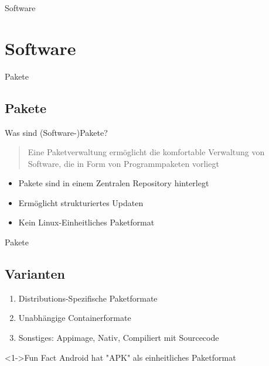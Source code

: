 
\begin{frame}{Software}
    \section{Software}\label{sec:software}
\end{frame}


\begin{frame}{Pakete}
    \subsection{Pakete}\label{subsec:pakete}

    Was sind (Software-)Pakete?
    \pause

    \vspace{0.5cm}
    \begin{quote}
        Eine Paketverwaltung ermöglicht die komfortable Verwaltung von Software, die in Form von Programmpaketen vorliegt
    \end{quote}
    \pause

    \begin{itemize}
        \item Pakete sind in einem Zentralen Repository hinterlegt\pause
        \item Ermöglicht strukturiertes Updaten\pause
        \item Kein Linux-Einheitliches Paketformat
    \end{itemize}
\end{frame}

\begin{frame}{Pakete}
    \subsection{Varianten}\label{subsec:varianten}

    \begin{enumerate}
        \item<1-> Distributions-Spezifische Paketformate
        \item<2-> Unabhängige Containerformate
        \item<3-> Sonstiges: Appimage, Nativ, Compiliert mit Sourcecode
    \end{enumerate}

    \vspace{0.5cm}
    \begin{exampleblock}<1->{Fun Fact}
        Android hat "APK" als einheitliches Paketformat
    \end{exampleblock}

\end{frame}

